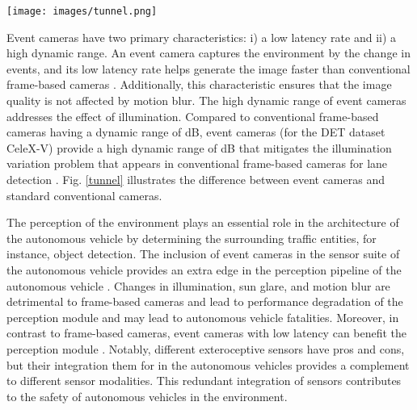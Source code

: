 \documentclass[journal]{IEEEtran}
\begin{document}
\begin{figure*}[t]
      \centering
      \texttt{[image: images/tunnel.png]}
\caption{A sequence of images captured while coming out of a tunnel (T1-T2-T3-T4-T5). The top row shows the grayscale images, and the bottom row shows the corresponding event camera images. RGB cameras are highly affected by illumination variations due to their low dynamic range. The figure is borrowed from \cite{Cheng2019} to illustrate the difference between event cameras and frame-based RGB cameras.}
      \label{tunnel}
\end{figure*}
Event cameras have two primary characteristics: i) a low latency rate and ii) a high dynamic range. An event camera captures the environment by the change in events, and its low latency rate helps generate the image faster than conventional frame-based cameras \cite{Gallego2019}. Additionally, this characteristic ensures that the image quality is not affected by motion blur. The high dynamic range of event cameras addresses the effect of illumination. Compared to conventional frame-based cameras having a dynamic range of  dB, event cameras (for the DET dataset CeleX-V) provide a high dynamic range of  dB that mitigates the illumination variation problem that appears in conventional frame-based cameras for lane detection \cite{Gallego2019} \cite{Mueggler2017}. Fig. \ref{tunnel} illustrates the difference between event cameras and standard conventional cameras.
\par 
 The perception of the environment plays an essential role in the architecture of the autonomous vehicle by determining the surrounding traffic entities, for instance, object detection. The inclusion of event cameras in the sensor suite of the autonomous vehicle provides an extra edge in the perception pipeline of the autonomous vehicle \cite{Chen}. Changes in illumination, sun glare, and motion blur are detrimental to frame-based cameras and lead to performance degradation of the perception module and may lead to autonomous vehicle fatalities. Moreover, in contrast to frame-based cameras, event cameras with low latency can benefit the perception module \cite{Gallego2019}. Notably, different exteroceptive sensors have pros and cons, but their integration them for in the autonomous vehicles provides a complement to different sensor modalities. This redundant integration of sensors contributes to the safety of autonomous vehicles in the environment.
\end{document}
